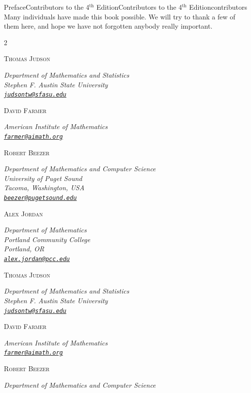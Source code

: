 \documentclass[oneside,10pt,]{book}
\newcommand{\mono}[1]{\texttt{#1}}
\numberwithin{equation}{section}
\newcommand{\contributor}[1]{\parbox{\linewidth}{#1}\par\bigskip}
\newcommand{\contributorname}[1]{\textsc{#1}\\[0.25\baselineskip]}
\newcommand{\contributorinfo}[1]{\hspace*{0.05\linewidth}\parbox{0.95\linewidth}{\textsl{#1}}}
\begin{document}
%
%
\typeout{************************************************}
\typeout{************************************************}
%
\begin{preface}{Preface}{Contributors to the 4\(^\mathrm{th}\) Edition}{}{Contributors to the 4\(^\mathrm{th}\) Edition}{}{}{contributors}
Many individuals have made this book possible.  We will try to thank a few of them here, and hope we have not forgotten anybody really important.%
\begin{multicols}{2}
\hypertarget{tjudson}{}%
\contributor{%
\contributorname{Thomas Judson}%
\contributorinfo{Department of Mathematics and Statistics\\
Stephen F. Austin State University\\
\mono{\href{mailto:judsontw@sfasu.edu}{\nolinkurl{judsontw@sfasu.edu}}}}%
}%
\hypertarget{dfarmer}{}%
\contributor{%
\contributorname{David Farmer}%
\contributorinfo{American Institute of Mathematics\\
\mono{\href{mailto:farmer@aimath.org}{\nolinkurl{farmer@aimath.org}}}}%
}%
\hypertarget{contributors-3-3}{}%
\contributor{%
\contributorname{Robert Beezer}%
\contributorinfo{Department of Mathematics and Computer Science\\
University of Puget Sound\\
Tacoma, Washington, USA\\
\mono{\href{mailto:beezer@pugetsound.edu}{\nolinkurl{beezer@pugetsound.edu}}}}%
}%
\hypertarget{contributors-3-4}{}%
\contributor{%
\contributorname{Alex Jordan}%
\contributorinfo{Department of Mathematics\\
Portland Community College\\
Portland, OR\\
\mono{\href{mailto:alex.jordan@pcc.edu}{\nolinkurl{alex.jordan@pcc.edu}}}}%
}%
\hypertarget{contributors-3-5}{}%
\contributor{%
\contributorname{Thomas Judson}%
\contributorinfo{Department of Mathematics and Statistics\\
Stephen F. Austin State University\\
\mono{\href{mailto:judsontw@sfasu.edu}{\nolinkurl{judsontw@sfasu.edu}}}}%
}%
\hypertarget{contributors-3-6}{}%
\contributor{%
\contributorname{David Farmer}%
\contributorinfo{American Institute of Mathematics\\
\mono{\href{mailto:farmer@aimath.org}{\nolinkurl{farmer@aimath.org}}}}%
}%
\hypertarget{contributors-3-7}{}%
\contributor{%
\contributorname{Robert Beezer}%
\contributorinfo{Department of Mathematics and Computer Science\\
}}
\end{multicols}
\end{preface}
\end{document}
